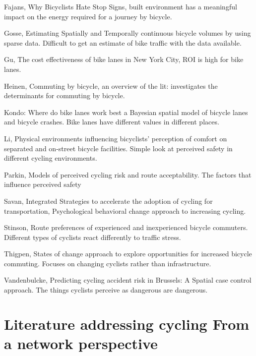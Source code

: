 \documentclass[11pt]{article} %
\begin{document}
Fajans, Why Bicyclists Hate Stop Signs, built environment has a meaningful impact on the energy required for a journey by bicycle. \cite{fajans2001bicyclists}

Gosse, Estimating Spatially and Temporally continuous bicycle volumes by using sparse data. Difficult to get an estimate of bike traffic with the data available. \cite{gosse2014estimating}

Gu, The cost effectiveness of bike lanes in New York City, ROI is high for bike lanes. \cite{gu2017cost}

Heinen, Commuting by bicycle, an overview of the lit: investigates the determinants for commuting by bicycle. \cite{heinen2010commuting}

Kondo: Where do bike lanes work best a Bayesian spatial model of bicycle lanes and bicycle crashes. Bike lanes have different values in different places. \cite{kondo2018bike}

Li, Physical environments influencing bicyclists' perception of comfort on separated and on-street bicycle facilities. Simple look at perceived safety in different cycling environments. \cite{li2012physical}

Parkin, Models of perceived cycling risk and route acceptability. The factors that influence perceived safety \cite{parkin2007models}

Savan, Integrated Strategies to accelerate the adoption of cycling for transportation, Psychological behavioral change approach to increasing cycling. \cite{savan2017integrated}

Stinson, Route preferences of experienced and inexperienced bicycle commuters. Different types of cyclists react differently to traffic stress. \cite{stinson2005comparison}

Thigpen, States of change approach to explore opportunities for increased bicycle commuting. Focuses on changing cyclists rather than infrastructure. \cite{thigpen2015using}

Vandenbulcke, Predicting cycling accident risk in Brussels: A Spatial case control approach. The things cyclists perceive as dangerous are dangerous. \cite{vandenbulcke2014predicting}


\section{Literature addressing cycling From a network perspective}
\end{document}
